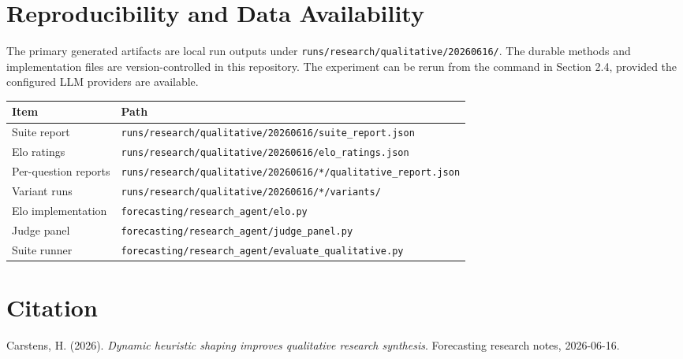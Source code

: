 \documentclass[11pt]{article}
\begin{document}
\section{Reproducibility and Data Availability}

The primary generated artifacts are local run outputs under
\texttt{runs/research/qualitative/20260616/}. The durable methods and
implementation files are version-controlled in this repository. The experiment
can be rerun from the command in Section 2.4, provided the configured LLM
providers are available.

\begin{center}
\begin{tabular}{ll}
\toprule
Item & Path \\
\midrule
Suite report & \texttt{runs/research/qualitative/20260616/suite\_report.json} \\
Elo ratings & \texttt{runs/research/qualitative/20260616/elo\_ratings.json} \\
Per-question reports & \texttt{runs/research/qualitative/20260616/*/qualitative\_report.json} \\
Variant runs & \texttt{runs/research/qualitative/20260616/*/variants/} \\
Elo implementation & \texttt{forecasting/research\_agent/elo.py} \\
Judge panel & \texttt{forecasting/research\_agent/judge\_panel.py} \\
Suite runner & \texttt{forecasting/research\_agent/evaluate\_qualitative.py} \\
\bottomrule
\end{tabular}
\end{center}

\section{Citation}

Carstens, H. (2026). \textit{Dynamic heuristic shaping improves qualitative
research synthesis}. Forecasting research notes, 2026-06-16.
\end{document}
